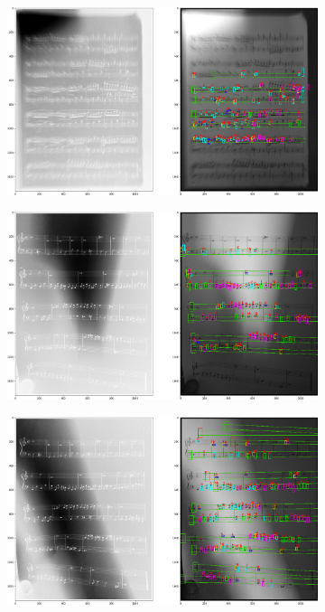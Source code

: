 \documentclass[12pt]{article}
\begin{document}
\begin{enumerate}
\begin{figure}
\begin{subfigure}[b]{0.48\linewidth}
				\end{subfigure}
				\begin{subfigure}[b]{0.48\linewidth}
					\includegraphics[width=\linewidth]{Hard/Zdj3.png}
				\end{subfigure}
				\begin{subfigure}[b]{0.48\linewidth}
					\includegraphics[width=\linewidth]{Hard/Zdj4.png}
				\end{subfigure}
				\begin{subfigure}[b]{0.48\linewidth}
					\includegraphics[width=\linewidth]{Hard/Zdj5.png}

\end{subfigure}
\end{figure}
\end{enumerate}
\end{document}
